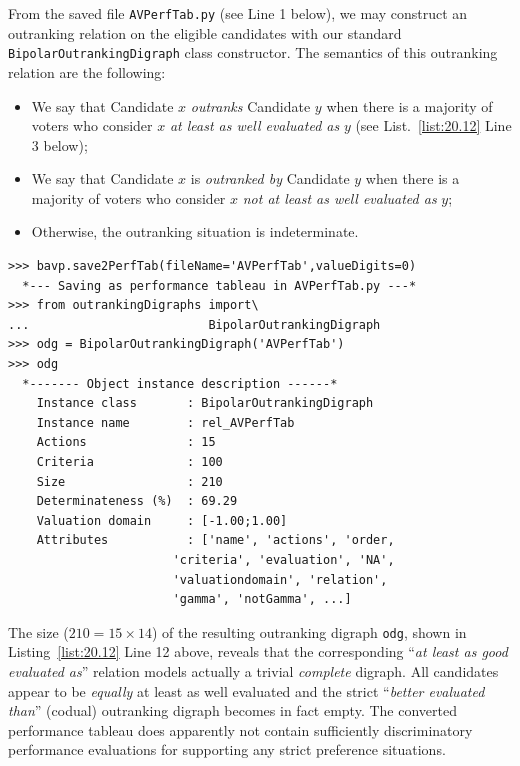 From the saved file \texttt{AVPerfTab.py} (see Line 1 below), we may construct an outranking relation on the eligible candidates with our standard \texttt{BipolarOutran\-kingDigraph} class constructor. The semantics of this outranking relation are the following:
\begin{itemize}[nosep,leftmargin=0.5cm,rightmargin=0.5cm]
\item We say that Candidate $x$ \emph{outranks} Candidate $y$ when there is a majority of voters who consider $x$ \emph{at least as well evaluated as} $y$ (see List.~\vref{list:20.12} Line 3 below);
\item We say that Candidate $x$ is \emph{outranked by} Candidate $y$ when there is a majority of voters who consider $x$ \emph{not at least as well evaluated as} $y$;
\item Otherwise, the outranking situation is indeterminate.
\end{itemize}
\begin{lstlisting}[caption={Computing the outranking digraph},label=list:20.12]
>>> bavp.save2PerfTab(fileName='AVPerfTab',valueDigits=0)
  *--- Saving as performance tableau in AVPerfTab.py ---*
>>> from outrankingDigraphs import\
...                         BipolarOutrankingDigraph
>>> odg = BipolarOutrankingDigraph('AVPerfTab')
>>> odg
  *------- Object instance description ------*
    Instance class       : BipolarOutrankingDigraph
    Instance name        : rel_AVPerfTab
    Actions              : 15
    Criteria             : 100
    Size                 : 210
    Determinateness (%)  : 69.29
    Valuation domain     : [-1.00;1.00]
    Attributes           : ['name', 'actions', 'order,
                       'criteria', 'evaluation', 'NA',
                       'valuationdomain', 'relation',
                       'gamma', 'notGamma', ...]
\end{lstlisting}

The size ($210 = 15 \times 14$) of the resulting outranking digraph \texttt{odg}, shown in Listing~\vref{list:20.12} Line 12 above, reveals that the corresponding ``\emph{at least as good evaluated as}'' relation models actually a trivial \emph{complete} digraph. All candidates appear to be \emph{equally} at least as well evaluated and the strict ``\emph{better evaluated than}'' (codual) outranking digraph becomes in fact empty. The converted performance tableau does apparently not contain sufficiently discriminatory performance evaluations for supporting any strict preference situations.

